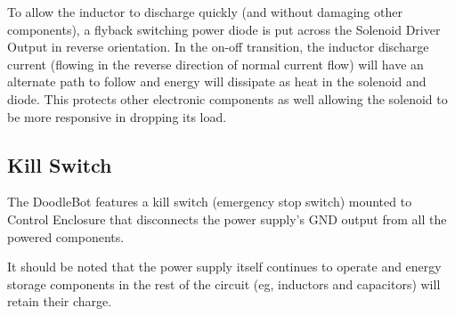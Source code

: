 		To allow the inductor to discharge quickly (and without damaging other components), a flyback switching power diode is put across the Solenoid Driver Output in reverse orientation. In the on-off transition, the inductor discharge current (flowing in the reverse direction of normal current flow) will have an alternate path to follow and energy will dissipate as heat in the solenoid and diode. This protects other electronic components as well allowing the solenoid to be more responsive in dropping its load.
		
	\subsection{Kill Switch}
		The DoodleBot features a kill switch (emergency stop switch) mounted to Control Enclosure that disconnects the power supply's GND output from all the powered components. 
		
		It should be noted that the power supply itself continues to operate and energy storage components in the rest of the circuit (eg, inductors and capacitors) will retain their charge.



